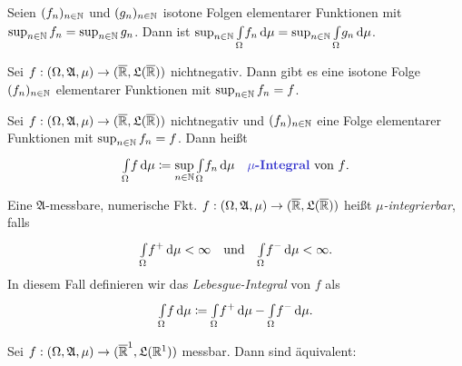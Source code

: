\documentclass{cheat-sheet}
\newcommand{\Alg}{\mathfrak{A}} %
\newcommand{\LebAlg}{\mathfrak{L}} %
\newcommand{\IntOmu}[1]{\Int{\Omega}{}{#1}{\mu}} %
\begin{document}
\begin{korollar}
  Seien $(f_n)_{n \in \mathbb{N}}$ und $(g_n)_{n \in \mathbb{N}}$ isotone Folgen elementarer Funktionen mit $\sup_{n \in \mathbb{N}} f_n = \sup_{n \in \mathbb{N}} g_n$. Dann ist $\sup_{n \in \N} \IntOmu{f_n} = \sup_{n \in \N} \IntOmu{g_n}$.
\end{korollar}

\begin{satz}
  Sei $f : (\Omega, \Alg, \mu) \to (\ER, \LebAlg(\ER))$ nichtnegativ. Dann gibt es eine isotone Folge $(f_n)_{n \in \mathbb{N}}$ elementarer Funktionen mit $\sup_{n \in \mathbb{N}} f_n = f$.
\end{satz}

\begin{defn}
  Sei $f : (\Omega, \Alg, \mu) \to (\ER, \LebAlg(\ER))$ nichtnegativ und $(f_n)_{n \in \mathbb{N}}$ eine Folge elementarer Funktionen mit $\sup_{n \in \mathbb{N}} f_n = f$. Dann heißt
  \[ \IntOmu{f} \coloneqq \sup_{n \in \N} \IntOmu{f_n} \quad \text{\emph{$\mu$-Integral} von $f$.} \]
\end{defn}


\begin{defn}
  Eine $\Alg$-messbare, numerische Fkt. $f : (\Omega, \Alg, \mu) \to (\ER, \LebAlg(\ER))$ heißt \emph{$\mu$-integrierbar}, falls
  \[ \IntOmu{f^+} < \infty \quad \text{und} \quad \IntOmu{f^-} < \infty. \]
  In diesem Fall definieren wir das \emph{Lebesgue-Integral} von $f$ als
  \[ \IntOmu{f} \coloneqq \IntOmu{f^+} - \IntOmu{f^-}. \]
\end{defn}



\begin{satz}
  Sei $f : (\Omega, \Alg, \mu) \to (\ER^1, \LebAlg(\R^1))$ messbar. Dann sind äquivalent:
  \begin{itemize}
  \end{itemize}
\end{satz}

\end{document}
